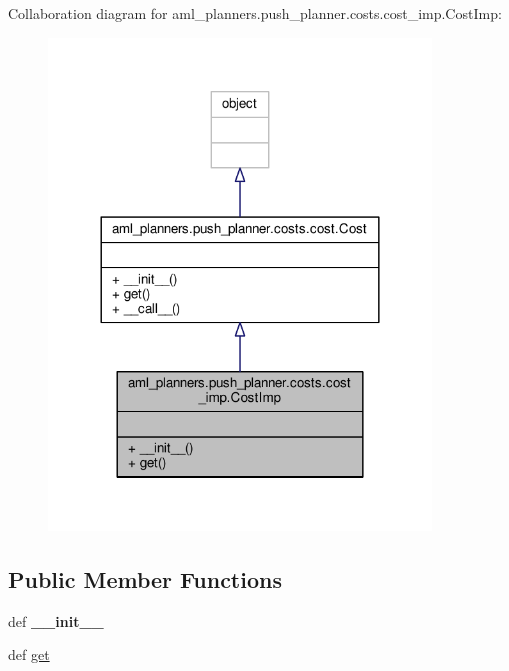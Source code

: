 Collaboration diagram for aml\-\_\-planners.\-push\-\_\-planner.\-costs.\-cost\-\_\-imp.\-Cost\-Imp\-:\nopagebreak
\begin{figure}[H]
\begin{center}
\leavevmode
\includegraphics[width=288pt]{classaml__planners_1_1push__planner_1_1costs_1_1cost__imp_1_1_cost_imp__coll__graph}
\end{center}
\end{figure}
\subsection*{Public Member Functions}
\begin{DoxyCompactItemize}
\item 
\hypertarget{classaml__planners_1_1push__planner_1_1costs_1_1cost__imp_1_1_cost_imp_a9c5c0e23b4a17c2f58e1283cfc6ec972}{def {\bfseries \-\_\-\-\_\-init\-\_\-\-\_\-}}\label{classaml__planners_1_1push__planner_1_1costs_1_1cost__imp_1_1_cost_imp_a9c5c0e23b4a17c2f58e1283cfc6ec972}

\item 
def \hyperlink{classaml__planners_1_1push__planner_1_1costs_1_1cost__imp_1_1_cost_imp_a99286a64797ef0a7f6b916acf0ac9f18}{get}
\end{DoxyCompactItemize}



